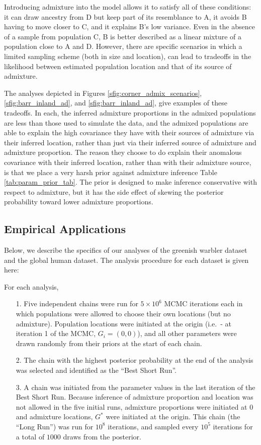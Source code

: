 \documentclass[12pt]{article}
\newcommand{\admixsource}[1]{{$G^{*}$}}
\begin{document}
Introducing admixture into the model allows it to satisfy all of these conditions: it can draw ancestry from D but keep part of its resemblance to A, it avoids B having to move closer to C, and it explains B's low variance.  Even in the absence of a sample from population C, B is better described as a linear mixture of a population close to A and D.  However, there are specific scenarios in which a limited sampling scheme (both in size and location), can lead to tradeoffs in the likelihood between estimated population location and that of its source of admixture.

The analyses depicted in Figures \ref{sfig:corner_admix_scenarios}, 
\ref{sfig:barr_inland_ad}, and
\ref{sfig:barr_inland_ad}, 
give examples of these tradeoffs.
In each, the inferred admixture proportions in the admixed populations are less than those used to simulate the data,
and the admixed populations are able to explain the high covariance they have with their sources of admixture via their inferred location,
rather than just via their inferred source of admixture and admixture proportion.  
The reason they choose to do explain their anomalous covariance with their inferred location,
rather than with their admixture source,
is that we place a very harsh prior against admixture inference Table \ref{tab:param_prior_tab}.
The prior is designed to make inference conservative with respect to admixture,
but it has the side effect of skewing the posterior probability toward lower admixture proportions.

\subsection*{Empirical Applications}
Below, we describe the specifics of our analyses of the greenish warbler dataset and the global human dataset.  The analysis procedure for each dataset is given here:

For each analysis,
\begin{itemize}
\item[1.] Five independent chains were run for $5\times 10^6$ MCMC iterations each in which populations were allowed to choose their own locations (but no admixture).  Population locations were initiated at the origin (i.e.\ - at iteration 1 of the MCMC, $G_i = (0,0)$), and all other parameters were drawn randomly from their priors at the start of each chain.  
\item[2.]The chain with the highest posterior probability at the end of the analysis was selected and identified as the ``Best Short Run''.
\item[3.] A chain was initiated from the parameter values in the last iteration of the Best Short Run.  Because inference of admixture proportion and location was not allowed in the five initial runs, admixture proportions were initiated at 0 and admixture locations, \admixsource{G} were initiated at the origin.  This  chain (the ``Long Run'') was run for $10^8$ iterations, and sampled every $10^5$ iterations for a total of $1000$ draws from the posterior.
\end{itemize}
\end{document}

